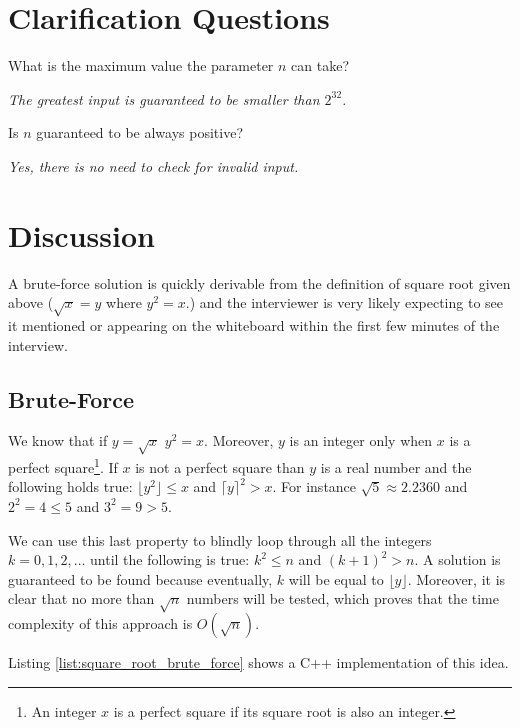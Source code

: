\section{Clarification Questions}
\begin{QandA}
	\item What is the maximum value the parameter $n$ can take?
	\begin{answered}
		\textit{The greatest input is guaranteed to be smaller than $2^{32}$.}
	\end{answered}
	
	\item Is $n$ guaranteed to be always positive?
	\begin{answered}
		\textit{Yes, there is no need to check for invalid input.}
	\end{answered}
\end{QandA}

\section{Discussion}
A brute-force solution is quickly derivable from the definition of square root given above ($\sqrt{x} = y$ where $y^2 = x$.) and the interviewer
is very likely expecting to see it mentioned or appearing on the whiteboard
within the first few minutes of the interview. 

\subsection{Brute-Force}
We know that if $y = \sqrt{x}$ $y^2 = x$. Moreover, $y$ is an integer only when $x$ is a perfect square\footnote{An integer $x$ is a perfect square if its square root is also an integer.}. 
If $x$ is not a perfect square than $y$ is a real number and the following holds true: 
$\lfloor{y}^2 \rfloor \leq x$ and $\lceil{y} \rceil^2 > x$.
For instance $\sqrt{5} \approx 2.2360$ and $2^2=4 \leq 5$ and $3^2=9 > 5$.

We can use this last property to blindly loop through all the integers $k=0,1,2,\ldots$ until 
the following is true: $k^2\leq n$ and $(k+1)^2 > n$.
A solution is guaranteed to be found because eventually, $k$ will be equal to $\lfloor y \rfloor$.
Moreover, it is clear that no more than $\sqrt{n}$ numbers will be tested, which proves that the time complexity of this approach is $O(\sqrt{n})$.

Listing \ref{list:square_root_brute_force} shows a C++ implementation of this idea.


